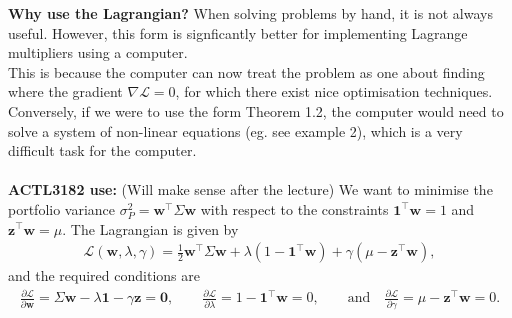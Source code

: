 \documentclass[11pt]{article}
\begin{document}
	\textbf{Why use the Lagrangian?} When solving problems by hand, it is not always useful. However, this form is signficantly better for implementing Lagrange multipliers using a computer.\\ This is because the computer can now treat the problem as one about finding where the gradient \( \nabla \mathcal{L} = 0\),
	for which there exist nice optimisation techniques. \\Conversely, if we were to use the form Theorem 1.2, the computer would need to solve a system of non-linear equations (eg. see example 2), which is a very difficult task for the computer. \\\\
	\textbf{ACTL3182 use:} (Will make sense after the lecture) We want to minimise the portfolio variance \( \sigma_P^2 = \bm{w}^{\top}\Sigma \bm{w} \) with respect to the constraints \( \bm{1}^{\top}\bm{w} = 1 \) and \( \bm{z}^{\top}\bm{w} = \mu \). The Lagrangian is given by
	\begin{align*}
		\mathcal{L}(\bm{w}, \lambda, \gamma)  = \frac{1}{2} \bm{w}^{\top} \Sigma \bm{w} + \lambda (1 - \bm{1}^{\top}\bm{w}) + \gamma (\mu - \bm{z}^{\top}\bm{w}),
	\end{align*}
	and the required conditions are 
	\begin{align*}
		\frac{\partial \mathcal{L}}{\partial\bm{w}} = \Sigma\bm{w} - \lambda\bm{1} - \gamma \bm{z} = \bm{0}, \qquad \frac{\partial \mathcal{L}}{\partial\lambda} = 1 - \bm{1}^{\top}\bm{w} = 0, \qquad\text{and}\quad \frac{\partial \mathcal{L}}{\partial\gamma} = \mu - \bm{z}^{\top}\bm{w} = 0.
	\end{align*}
	\newpage
\end{document}
